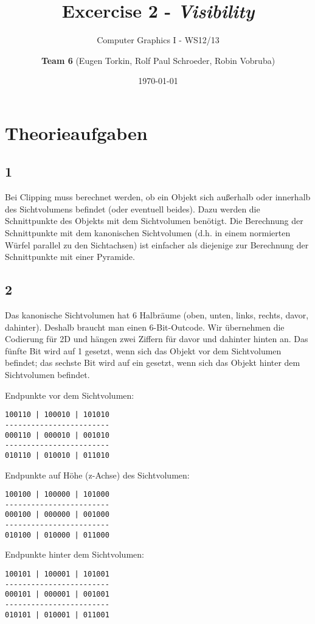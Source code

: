 \documentclass[a4paper,headings=small]{scrartcl}
\title{Excercise 2 - \emph{Visibility}}
\subtitle{Computer Graphics I - WS12/13}
\author{\textbf{Team 6} (Eugen Torkin, Rolf Paul Schroeder, Robin Vobruba)}
\date{\today}
\numberwithin{equation}{section} %
\numberwithin{figure}{section}   %
\begin{document}
\maketitle


\section{Theorieaufgaben}

\subsection{1}

Bei Clipping muss berechnet werden, ob ein Objekt sich außerhalb oder innerhalb des Sichtvolumens befindet (oder eventuell beides). Dazu werden die Schnittpunkte des Objekts mit dem Sichtvolumen benötigt. Die Berechnung der Schnittpunkte mit dem kanonischen Sichtvolumen (d.h. in einem normierten Würfel parallel zu den Sichtachsen) ist einfacher als diejenige zur Berechnung der Schnittpunkte mit einer Pyramide.

\subsection{2}

Das kanonische Sichtvolumen hat 6 Halbräume (oben, unten, links, rechts, davor, dahinter). Deshalb braucht man einen 6-Bit-Outcode. Wir übernehmen die Codierung für 2D und hängen zwei Ziffern für davor und dahinter hinten an. Das fünfte Bit wird auf 1 gesetzt, wenn sich das Objekt vor dem Sichtvolumen befindet; das sechste Bit wird auf ein gesetzt, wenn sich das Objekt hinter dem Sichtvolumen befindet.

Endpunkte vor dem Sichtvolumen:
\begin{verbatim}
100110 | 100010 | 101010
------------------------
000110 | 000010 | 001010
------------------------
010110 | 010010 | 011010
\end{verbatim}

Endpunkte auf Höhe (z-Achse) des Sichtvolumen:
\begin{verbatim}
100100 | 100000 | 101000
------------------------
000100 | 000000 | 001000
------------------------
010100 | 010000 | 011000
\end{verbatim}

Endpunkte hinter dem Sichtvolumen:
\begin{verbatim}
100101 | 100001 | 101001
------------------------
000101 | 000001 | 001001
------------------------
010101 | 010001 | 011001
\end{verbatim}
\end{document}
